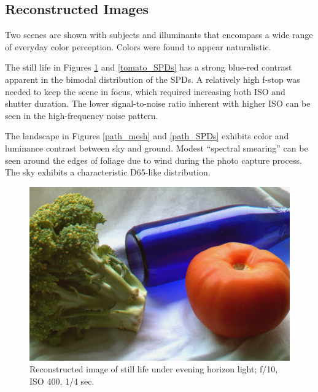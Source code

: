 \documentclass[twocolumn,10pt]{asme2ej}
\newcommand{\id}{\hspace{6 mm}}
\begin{document}
\clearpage
\twocolumn

\subsection{Reconstructed Images}

Two scenes are shown with subjects and illuminants that encompass a wide range of everyday color perception. Colors were found to appear naturalistic.

\id The still life in Figures \ref{tomato_mesh} and \ref{tomato_SPDs} has a strong blue-red contrast apparent in the bimodal distribution of the SPDs. A relatively high f-stop was needed to keep the scene in focus, which required increasing both ISO and shutter duration. The lower signal-to-noise ratio inherent with higher ISO can be seen in the high-frequency noise pattern.

\id The landscape in Figures \ref{path_mesh} and \ref{path_SPDs} exhibits color and luminance contrast between sky and ground. Modest ``spectral smearing'' can be seen around the edges of foliage due to wind during the photo capture process. The sky exhibits a characteristic D65-like distribution.

\begin{figure}[H]
\begin{centering}
  \includegraphics[width=1.00\linewidth]{broccoli_bottle_tomato.jpg}
  \caption{Reconstructed image of still life under evening horizon light; f/10, ISO 400, 1/4 sec.}
  \label{tomato_mesh}
  \end{centering}
\end{figure}
\end{document}
